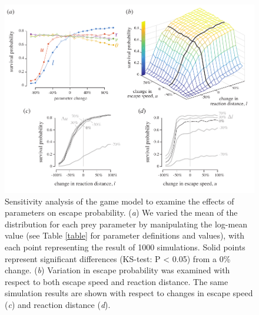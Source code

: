 \documentclass[]{rsos}%
\begin{document}
\begin{figure}[!h]
\centering
	\includegraphics[width=5.5in]{fig_sensitivity}
\caption{Sensitivity analysis of the game model to examine the effects of parameters on escape probability. 
(\textit{a}) We varied the mean of the distribution for each prey parameter by manipulating the log-mean value (see Table \ref{table} for parameter definitions and values), with each point representing the result of 1000 simulations. 
Solid points represent significant differences (KS-test: P < 0.05) from a 0\% change.
(\textit{b}) Variation in escape probability was examined with respect to both escape speed and reaction distance.
The same simulation results are shown with respect to changes in escape speed (\textit{c}) and reaction distance (\textit{d}).
}
\label{fig_sense}
\end{figure}

\pagebreak
\end{document}
